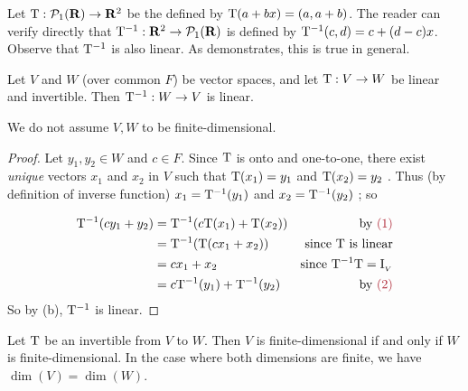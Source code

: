 \begin{example} \label{example 2.4.1}
Let \(\mathrm{T} : \mathcal{P}_1(\mathbf{R}) \to \mathbf{R}^2\) be the \LTRAN{} defined by \(\mathrm{T}(a + bx) = (a, a + b)\).
The reader can verify directly that \(\mathrm{T}^{-1} : \mathbf{R}^2 \to \mathcal{P}_1(\mathbf{R})\) is defined by \(\mathrm{T}^{-1}(c, d) = c + (d - c)x\).
Observe that \(\mathrm{T}^{-1}\) is also linear.
As  demonstrates, this is true in general.
\end{example}

\begin{theorem} \label{thm 2.17}
Let \(V\) and \(W\) (over common \(F\)) be vector spaces, and let \(\mathrm{T} : V \to W\) be linear and invertible.
Then \(\mathrm{T}^{-1} : W \to V\) is linear.
\end{theorem}

\begin{note}
We do not assume \(V, W\) to be finite-dimensional.
\end{note}

\begin{proof}
Let \(y_1, y_2 \in W\) and \(c \in F\).
Since \(\mathrm{T}\) is onto and one-to-one, there exist \emph{unique} vectors \(x_1\) and \(x_2\) in \(V\) such that \(\mathrm{T}(x_1) = y_1\) and \(\mathrm{T}(x_2) = y_2\) .
Thus (by definition of inverse function) \(x_1 = \mathrm{T}^{-1}(y_1)\) and \(x_2 = \mathrm{T}^{-1}(y_2)\) ; so

\begin{align*}
    \T^{-1}(cy_1 + y_2) & = \T^{-1}(c\T(x_1) + \T(x_2)) & \text{by \MAROON{(1)}} \\
                        & = \T^{-1}(\T(cx_1 + x_2)) & \text{since \(\T\) is linear} \\
                        & = cx_1 + x_2 & \text{since \(\T^{-1}\T = \ITRANV\)} \\
                        & = c\T^{-1}(y_1) + \T^{-1}(y_2) & \text{by \MAROON{(2)}}
\end{align*}
So by (b), \(\mathrm{T}^{-1}\) is linear.
\end{proof}

\begin{corollary} \label{corollary 2.17.1}
Let \(\mathrm{T}\) be an invertible \LTRAN{} from \(V\) to \(W\).
Then \(V\) is finite-dimensional if and only if \(W\) is finite-dimensional.
In the case where both dimensions are finite, we have \(\dim(V) = \dim(W)\).
\end{corollary}

